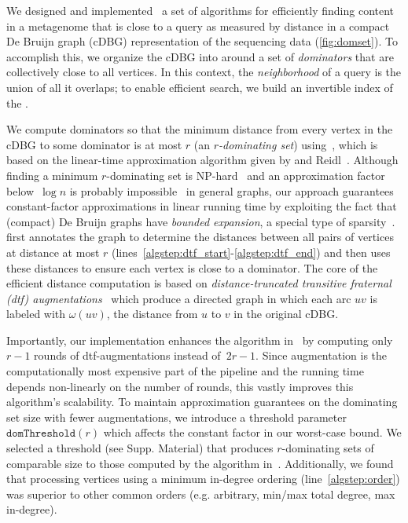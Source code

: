 We designed and implemented~\cite{spacegraphcats} a set of algorithms for efficiently
finding content in a metagenome that is close to a query as measured
by distance in a compact De Bruijn graph (cDBG) representation of the
sequencing data (\autoref{fig:domset}). To accomplish this, we organize the cDBG into {\em \pieces}
around a set of \emph{dominators} that are collectively close to all vertices. In this
context, the {\em neighborhood} of a query is the union of all \pieces it overlaps;
to enable efficient search, we build an invertible index of the \pieces.

We compute dominators so that the minimum distance from every vertex
in the cDBG to some dominator is at most $r$ (an \emph{$r$-dominating set})
using~, which is based on the linear-time approximation algorithm
given by \Dvorak and Reidl~\cite{felixThesis}. Although finding a minimum $r$-dominating set is
NP-hard~\cite{karp1972reducibility,chlebik2008approximation,downey2012parameterized} and
an approximation factor below~$\log n$ is probably impossible~\cite{chlebik2008approximation}
in general graphs, our approach guarantees constant-factor approximations
in linear running time by exploiting the fact that
(compact) De Bruijn graphs have \emph{bounded expansion}, a special type of
sparsity~\cite{sparsity}.  first
annotates the graph to determine the distances between all pairs of vertices at
distance at most $r$ (lines~\ref{algstep:dtf_start}-\ref{algstep:dtf_end}) and
then uses these distances to ensure each vertex is close to a dominator.
The core of the efficient distance computation is based on
\emph{distance-truncated transitive fraternal (dtf) augmentations}~\cite{felixThesis}
which produce a directed graph in which each arc $uv$ is labeled with
$\omega(uv)$, the distance from $u$ to $v$ in the original cDBG.

Importantly, our implementation enhances the algorithm
in~\cite{felixThesis} by computing only $r{-}1$ rounds of dtf-augmentations
instead of~$2r{-}1$. Since augmentation is the computationally most
expensive part of the pipeline and the running time depends non-linearly on
the number of rounds, this vastly improves this algorithm's scalability.
To maintain approximation guarantees on the dominating set size with fewer augmentations,
we introduce a threshold parameter $\texttt{domThreshold}(r)$
which affects the constant factor in our worst-case bound.
We selected a threshold (see Supp. Material) that produces $r$-dominating sets of
comparable size to those computed by the algorithm in~\cite{felixThesis}. Additionally,
we found that processing vertices using a minimum in-degree ordering (line~\ref{algstep:order})
was superior to other common orders (e.g. arbitrary, min/max total degree, max in-degree).

